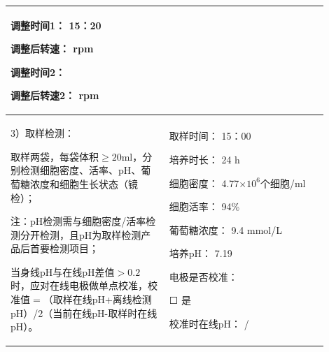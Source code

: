 \documentclass[UTF8,10pt,a4paper,fontset=fandol]{ctexart}
\newcommand{\fieldvalue}[1]{#1}
\newcommand{\handwritten}[1]{#1}
\newcommand{\checkboxfield}[1]{\ifstrequal{#1}{checked}{☑}{\ifstrequal{#1}{unclear}{?}{☐}}}
\begin{document}
\begin{tabular}{|p{0.45\linewidth}|p{0.45\linewidth}|}
\begin{minipage}[t]{0.42\linewidth}
调整时间1：
\fieldvalue{\handwritten{15：20}}

调整后转速：\underline{\hspace{2em}} rpm

调整时间2：\underline{\hspace{2em}}

调整后转速2：\underline{\hspace{2em}} rpm
\end{minipage}
\\
\hline
\begin{minipage}[t]{0.42\linewidth}
\vspace{0.2em}
3）取样检测：

取样两袋，每袋体积$\geq20$ml，分别检测细胞密度、活率、pH、葡萄糖浓度和细胞生长状态（镜检）；

注：pH检测需与细胞密度/活率检测分开检测，且pH为取样检测产品后首要检测项目；

当身线pH与在线pH差值$>0.2$时，应对在线电极做单点校准，校准值$=$（取样在线pH+离线检测pH）/2（当前在线pH-取样时在线pH）。
\end{minipage}
&
\begin{minipage}[t]{0.42\linewidth}
取样时间：
\fieldvalue{\handwritten{15：00}}

培养时长：
\fieldvalue{\handwritten{24}} h

细胞密度：
\fieldvalue{\handwritten{4.77}}\(\times10^{6}\)个细胞/ml

细胞活率：
\fieldvalue{\handwritten{94}}\%

葡萄糖浓度：
\fieldvalue{\handwritten{9.4}} mmol/L

培养pH：
\fieldvalue{\handwritten{7.19}}

电极是否校准：

\fieldvalue{\checkboxfield{unchecked}} 是

校准时在线pH：
\fieldvalue{\handwritten{/}}


\end{minipage}
\end{tabular}
\end{document}
